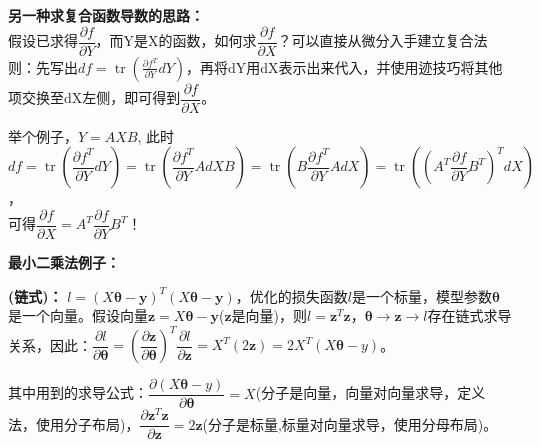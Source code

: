 \documentclass[UTF8]{article}
\begin{document}
    \textbf{另一种求复合函数导数的思路：}
    \\
    假设已求得$\dfrac{\partial f}{\partial Y}$，而Y是X的函数，如何求$\dfrac{\partial f}{\partial X}$？可以直接从微分入手建立复合法则：先写出$d f=\operatorname{tr}\left(\frac{\partial f^{T}}{\partial Y} d Y\right)$，再将dY用dX表示出来代入，并使用迹技巧将其他项交换至dX左侧，即可得到$\dfrac{\partial f}{\partial X}$。


    举个例子，$Y=AXB$, 此时
    \\
    $d f=\operatorname{tr}\left(\dfrac{\partial f^{T}}{\partial Y} d Y\right)=\operatorname{tr}\left(\dfrac{\partial f^{T}}{\partial Y} A d X B\right)=\operatorname{tr}\left(B \dfrac{\partial f^{T}}{\partial Y} A d X\right)=\operatorname{tr}\left(\left(A^{T} \dfrac{\partial f}{\partial Y} B^{T}\right)^{T} d X\right)$，
    \\
    可得$\dfrac{\partial f}{\partial X}=A^{T} \dfrac{\partial f}{\partial Y} B^{T}$！

    \textbf{最小二乘法例子：}


    \textbf{(链式)：} $l=(X \bm{\theta-y})^{T}(X \bm{\theta-y})$，优化的损失函数$l$是一个标量，模型参数$\bm{\bm{\theta}}$是一个向量。假设向量$\bm{\bm{z}}=X \bm{\theta-y}$($\bm{z}$是向量)，则$l=\bm{z}^{T} \bm{z}$，$\bm{\theta} \rightarrow \bm{z} \rightarrow l$存在链式求导关系，因此：$\dfrac{\partial l}{\partial \bm{\theta}}=\left(\dfrac{\partial \bm{z}}{\partial \bm{\theta}}\right)^{T} \dfrac{\partial l}{\partial \mathbf{\bm{z}}}=X^{T}(2 \bm{z})=2 X^{T}(X \bm{\theta}-y)$。


    其中用到的求导公式：$\dfrac{\partial (X \bm{\theta}-y)}{\partial \bm{\theta}}=X$(分子是向量，向量对向量求导，定义法，使用分子布局)，$\dfrac{\partial \bm{z}^{T} \bm{z}}{\partial \bm{z}}=2 \bm{z}$(分子是标量,标量对向量求导，使用分母布局)。
\end{document}
